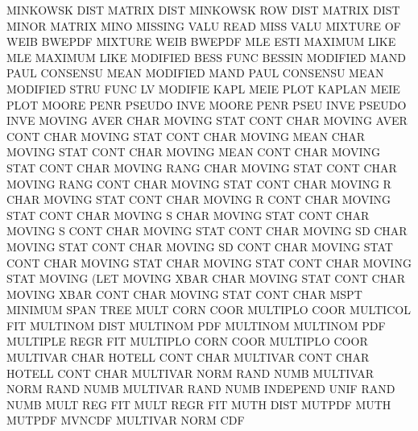 MINKOWSK DIST                           MATRIX   DIST
MINKOWSK ROW  DIST                      MATRIX   DIST
MINOR                                   MATRIX   MINO
MISSING  VALU                           READ     MISS VALU 
MIXTURE  OF   WEIB                      BWEPDF
MIXTURE  WEIB                           BWEPDF
MLE      ESTI                           MAXIMUM  LIKE
MLE                                     MAXIMUM  LIKE
MODIFIED BESS FUNC                      BESSIN
MODIFIED MAND PAUL                      CONSENSU MEAN
MODIFIED MAND PAUL                      CONSENSU MEAN
MODIFIED STRU FUNC                      LV
MODIFIE  KAPL MEIE PLOT                 KAPLAN   MEIE PLOT
MOORE    PENR                           PSEUDO   INVE
MOORE    PENR PSEU INVE                 PSEUDO   INVE
MOVING   AVER CHAR                      MOVING   STAT CONT CHAR
MOVING   AVER CONT CHAR                 MOVING   STAT CONT CHAR
MOVING   MEAN CHAR                      MOVING   STAT CONT CHAR
MOVING   MEAN CONT CHAR                 MOVING   STAT CONT CHAR
MOVING   RANG CHAR                      MOVING   STAT CONT CHAR
MOVING   RANG CONT CHAR                 MOVING   STAT CONT CHAR
MOVING   R    CHAR                      MOVING   STAT CONT CHAR
MOVING   R    CONT CHAR                 MOVING   STAT CONT CHAR
MOVING   S    CHAR                      MOVING   STAT CONT CHAR
MOVING   S    CONT CHAR                 MOVING   STAT CONT CHAR
MOVING   SD   CHAR                      MOVING   STAT CONT CHAR
MOVING   SD   CONT CHAR                 MOVING   STAT CONT CHAR
MOVING   STAT CHAR                      MOVING   STAT CONT CHAR
MOVING   STAT                           MOVING   (LET
MOVING   XBAR CHAR                      MOVING   STAT CONT CHAR
MOVING   XBAR CONT CHAR                 MOVING   STAT CONT CHAR
MSPT                                    MINIMUM  SPAN TREE
MULT     CORN COOR                      MULTIPLO COOR
MULTICOL                                FIT
MULTINOM DIST                           MULTINOM PDF
MULTINOM                                MULTINOM PDF
MULTIPLE REGR                           FIT
MULTIPLO CORN COOR                      MULTIPLO COOR
MULTIVAR CHAR                           HOTELL   CONT CHAR
MULTIVAR CONT CHAR                      HOTELL   CONT CHAR
MULTIVAR NORM RAND NUMB                 MULTIVAR NORM RAND NUMB
MULTIVAR RAND NUMB                      INDEPEND UNIF RAND NUMB
MULT     REG                            FIT
MULT     REGR                           FIT
MUTH     DIST                           MUTPDF
MUTH                                    MUTPDF
MVNCDF                                  MULTIVAR NORM CDF
